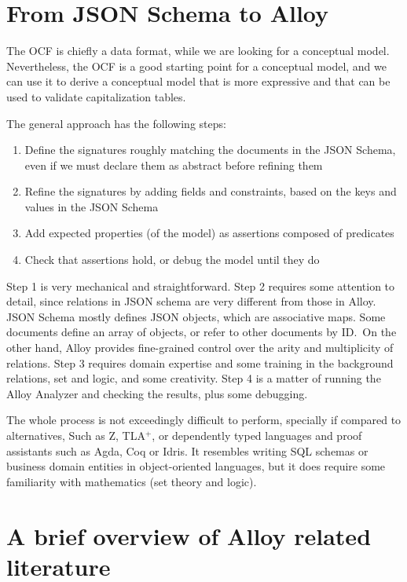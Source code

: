 \section{From JSON Schema to Alloy}

The OCF is chiefly a data format, while we are looking for a conceptual model. Nevertheless, the OCF is a good starting point for a conceptual model, and we can use it to derive a conceptual model that is more expressive and that can be used to validate capitalization tables.

The general approach has the following steps:

\begin{enumerate}
	\item Define the signatures roughly matching the documents in the JSON Schema, even if we must declare them as abstract before refining them
	\item Refine the signatures by adding fields and constraints, based on the keys and values in the JSON Schema
	\item Add expected properties (of the model) as assertions composed of predicates
	\item Check that assertions hold, or debug the model until they do
\end{enumerate}

Step 1 is very mechanical and straightforward. Step 2 requires some attention to detail, since relations in JSON schema are very different from those in Alloy. JSON Schema mostly defines JSON objects, which are associative maps. Some documents define an array of objects, or refer to other documents by ID.~On the other hand, Alloy provides fine-grained control over the arity and multiplicity of relations. Step 3 requires domain expertise and some training in the background relations, set and logic, and some creativity. Step 4 is a matter of running the Alloy Analyzer and checking the results, plus some debugging.

The whole process is not exceedingly difficult to perform, specially if compared to alternatives, Such as Z, TLA$^{+}$, or dependently typed languages and proof assistants such as Agda, Coq or Idris. It resembles writing SQL schemas or business domain entities in object-oriented languages, but it does require some familiarity with mathematics (set theory and logic).

\section{A brief overview of Alloy related literature}

